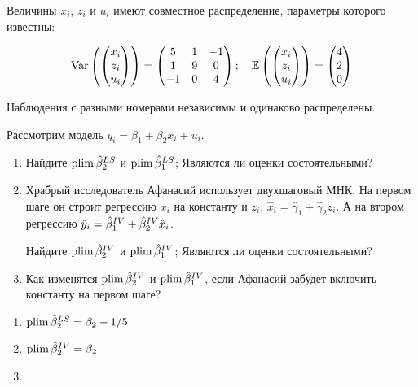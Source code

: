 \begin{problem}
Величины $x_i$, $z_i$ и $u_i$ имеют совместное распределение, параметры которого известны:

\[
  \operatorname{Var}\left(\begin{pmatrix}
    x_i \\
    z_i \\
    u_i \\
\end{pmatrix}\right)=
\begin{pmatrix}
  5 & 1 & -1 \\
  1 & 9 & 0 \\
  -1 & 0 & 4 \\
\end{pmatrix};
\quad
\operatorname{\mathbb E}\left(\begin{pmatrix}
    x_i \\
    z_i \\
    u_i \\
\end{pmatrix}\right)=
\begin{pmatrix}
4 \\
2 \\
0 \\
\end{pmatrix}
\]

Наблюдения с разными номерами независимы и одинаково распределены.

Рассмотрим модель $y_i =\beta_1 + \beta_2 x_i + u_i$.

\begin{enumerate}
  \item Найдите $\operatorname*{plim} \hat{\beta}_2^{LS}$ и $\operatorname*{plim} \hat{\beta}_1^{LS}$; Являются ли оценки состоятельными?
  \item Храбрый исследователь Афанасий использует двухшаговый МНК.
    На первом шаге он строит регрессию $x_i$ на константу и $z_i$, $\hat x_i = \hat \gamma_1 + \hat \gamma_2 z_i$.
    А на втором регрессию $\hat y_i = \hat{\beta}_1^{IV} + \hat{\beta}_2^{IV} \hat x_i$.

    Найдите $\operatorname*{plim} \hat{\beta}_2^{IV}$ и $\operatorname*{plim} \hat{\beta}_1^{IV}$; Являются ли оценки состоятельными?
  \item Как изменятся $\operatorname*{plim} \hat{\beta}_2^{IV}$ и $\operatorname*{plim} \hat{\beta}_1^{IV}$, если Афанасий забудет включить константу на первом шаге?
\end{enumerate}

\begin{sol}
\begin{enumerate}
  \item $\operatorname*{plim} \hat{\beta}_2^{LS} = \beta_2 - 1/5$
  \item $\operatorname*{plim} \hat{\beta}_2^{IV} = \beta_2$
  \item 
\end{enumerate}  
\end{sol}
\end{problem}

